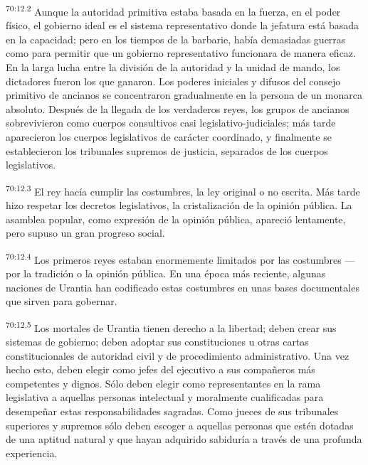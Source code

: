 \documentclass[twoside, 11pt]{book}
\begin{document}
\par
\textsuperscript{70:12.2} Aunque la autoridad primitiva estaba basada en la fuerza, en el poder físico, el gobierno ideal es el sistema representativo donde la jefatura está basada en la capacidad; pero en los tiempos de la barbarie, había demasiadas guerras como para permitir que un gobierno representativo funcionara de manera eficaz. En la larga lucha entre la división de la autoridad y la unidad de mando, los dictadores fueron los que ganaron. Los poderes iniciales y difusos del consejo primitivo de ancianos se concentraron gradualmente en la persona de un monarca absoluto. Después de la llegada de los verdaderos reyes, los grupos de ancianos sobrevivieron como cuerpos consultivos casi legislativo-judiciales; más tarde aparecieron los cuerpos legislativos de carácter coordinado, y finalmente se establecieron los tribunales supremos de justicia, separados de los cuerpos legislativos.

\par
\textsuperscript{70:12.3} El rey hacía cumplir las costumbres, la ley original o no escrita. Más tarde hizo respetar los decretos legislativos, la cristalización de la opinión pública. La asamblea popular, como expresión de la opinión pública, apareció lentamente, pero supuso un gran progreso social.

\par
\textsuperscript{70:12.4} Los primeros reyes estaban enormemente limitados por las costumbres ---por la tradición o la opinión pública. En una época más reciente, algunas naciones de Urantia han codificado estas costumbres en unas bases documentales que sirven para gobernar.

\par
\textsuperscript{70:12.5} Los mortales de Urantia tienen derecho a la libertad; deben crear sus sistemas de gobierno; deben adoptar sus constituciones u otras cartas constitucionales de autoridad civil y de procedimiento administrativo. Una vez hecho esto, deben elegir como jefes del ejecutivo a sus compañeros más competentes y dignos. Sólo deben elegir como representantes en la rama legislativa a aquellas personas intelectual y moralmente cualificadas para desempeñar estas responsabilidades sagradas. Como jueces de sus tribunales superiores y supremos sólo deben escoger a aquellas personas que estén dotadas de una aptitud natural y que hayan adquirido sabiduría a través de una profunda experiencia.
\end{document}
